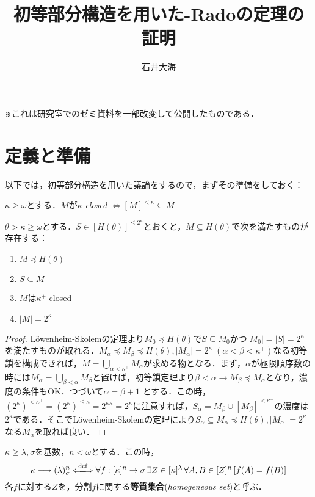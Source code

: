 \documentclass[a4paper]{bxjsarticle}
\title{初等部分構造を用いた\Erdos-Radoの定理の証明}
\author{石井大海}
\begin{document}
\maketitle

※これは研究室でのゼミ資料を一部改変して公開したものである．
\section{定義と準備}
以下では，初等部分構造を用いた議論をするので，まずその準備をしておく：
\begin{definition}
 $\kappa \geq \omega$とする．$M$が$\kappa$-{\itshape closed} $\Leftrightarrow [M]^{<\kappa} \subseteq M$
\end{definition}

\begin{lemma}\label{lem:LS-generalized}
 $\theta > \kappa \geq \omega$とする．$S \in [H(\theta)]^{\leq 2^\kappa}$とおくと，$M \subseteq H(\theta)$で次を満たすものが存在する：
 \begin{enumerate}
  \item $M \preccurlyeq H(\theta)$
  \item $S \subseteq M$
  \item $M$は$\kappa^+$-closed
  \item $|M| = 2^\kappa$
 \end{enumerate}
\end{lemma}
\begin{proof}
 L\"{o}wenheim-Skolemの定理より$M_0 \preccurlyeq H(\theta)$で$S \subseteq M_0$かつ$|M_0| = |S| = 2^\kappa$を満たすものが取れる．$M_\alpha \preccurlyeq M_\beta \preccurlyeq H(\theta), |M_\alpha| = 2^\kappa\; (\alpha < \beta < \kappa^+)$なる初等鎖を構成できれば，$M = \bigcup_{\alpha < \kappa^+} M_\alpha$が求める物となる．まず，$\alpha$が極限順序数の時には$M_\alpha = \bigcup_{\beta < \alpha} M_\beta$と置けば，初等鎖定理より$\beta < \alpha \rightarrow M_\beta \preccurlyeq M_\alpha$となり，濃度の条件もOK．つづいて$\alpha = \beta + 1$ とする．この時，$(2^{\kappa})^{<\kappa^+} =(2^\kappa)^{\leq \kappa} = 2^{\kappa \kappa} = 2^\kappa$に注意すれば，$S_\alpha = M_\beta \cup [M_\beta]^{<\kappa^+}$の濃度は$2^\kappa$である．そこでL\"{o}wenheim-Skolemの定理により$S_\alpha \subseteq M_\alpha \preccurlyeq H(\theta), |M_\alpha| = 2^\kappa$なる$M_\alpha$を取れば良い．\mbox{}
\end{proof}
\begin{definition}
 $\kappa \geq \lambda, \sigma$を基数，$n<\omega$とする．この時，
 \[
 \kappa \longrightarrow (\lambda)^n_\sigma
 \defs \forall f: [\kappa]^n \to \sigma\, \exists Z \in [\kappa]^\lambda\, \forall A, B \in [Z]^n \left[ f(A) = f(B)\right]
 \]
 各$f$に対する$Z$を，分割$f$に関する{\bfseries 等質集合}({\itshape homogeneous set})と呼ぶ．
\end{definition}
\end{document}
